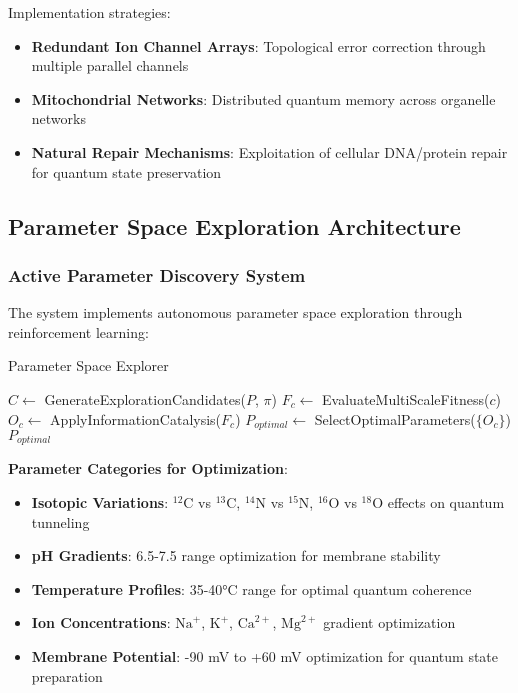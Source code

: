 ﻿\documentclass[11pt,a4paper]{article}
\begin{document}
Implementation strategies:
\begin{itemize}
\item \textbf{Redundant Ion Channel Arrays}: Topological error correction through multiple parallel channels
\item \textbf{Mitochondrial Networks}: Distributed quantum memory across organelle networks
\item \textbf{Natural Repair Mechanisms}: Exploitation of cellular DNA/protein repair for quantum state preservation
\end{itemize}

\subsection{Parameter Space Exploration Architecture}

\subsubsection{Active Parameter Discovery System}

The system implements autonomous parameter space exploration through reinforcement learning:

\begin{algorithm}
\caption{Parameter Space Explorer}
\begin{algorithmic}
    \State $C \leftarrow$ GenerateExplorationCandidates($P$, $\pi$)
        \State $F_c \leftarrow$ EvaluateMultiScaleFitness($c$)
        \State $O_c \leftarrow$ ApplyInformationCatalysis($F_c$)
    \EndFor
    \State $P_{optimal} \leftarrow$ SelectOptimalParameters($\{O_c\}$)
    \State \Return $P_{optimal}$
\EndProcedure
\end{algorithmic}
\end{algorithm}

\textbf{Parameter Categories for Optimization}:
\begin{itemize}
\item \textbf{Isotopic Variations}: $^{12}$C vs $^{13}$C, $^{14}$N vs $^{15}$N, $^{16}$O vs $^{18}$O effects on quantum tunneling
\item \textbf{pH Gradients}: 6.5-7.5 range optimization for membrane stability
\item \textbf{Temperature Profiles}: 35-40°C range for optimal quantum coherence
\item \textbf{Ion Concentrations}: $\text{Na}^+$, $\text{K}^+$, $\text{Ca}^{2+}$, $\text{Mg}^{2+}$ gradient optimization
\item \textbf{Membrane Potential}: -90 mV to +60 mV optimization for quantum state preparation
\end{itemize}
\end{document}
